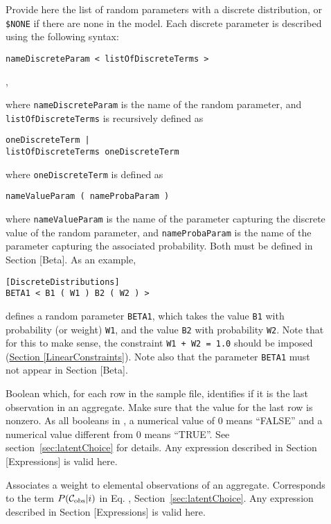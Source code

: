 \documentclass[12pt]{memoir}
\begin{document}
\begin{description}
\item[] Provide here the list of random parameters with a discrete distribution, or \verb+$NONE+ if there are none in the model. Each discrete parameter is described using the following syntax:
{\footnotesize
\begin{verbatim}
nameDiscreteParam < listOfDiscreteTerms >
\end{verbatim}, 
}
where \verb+nameDiscreteParam+ is the name of the random parameter, and 
  \verb+listOfDiscreteTerms+ is recursively defined as
{\footnotesize
\begin{verbatim}
oneDiscreteTerm |
listOfDiscreteTerms oneDiscreteTerm
\end{verbatim}
}
where \verb+oneDiscreteTerm+ is defined as 
{\footnotesize
\begin{verbatim}
nameValueParam ( nameProbaParam )
\end{verbatim}
}
where \verb+nameValueParam+ is the name of the parameter capturing the discrete value of the random parameter, and \verb+nameProbaParam+ is the name of the parameter capturing the associated probability. Both must be defined in Section [Beta]. As an example,
{\footnotesize
\begin{verbatim}
[DiscreteDistributions]
BETA1 < B1 ( W1 ) B2 ( W2 ) >
\end{verbatim}
}
defines a random parameter \verb+BETA1+, which takes the value \verb+B1+ with probability (or weight) \verb+W1+, and the value \verb+B2+ with probability \verb+W2+. Note that for this to make sense, the constraint \verb-W1 + W2 = 1.0- should be imposed (\hyperlink{LinearConstraints}{Section [LinearConstraints]}). Note also that the parameter \verb+BETA1+ must not appear in Section [Beta].

\item[] Boolean which, for each row in the sample file,   identifies if it is the last observation in an aggregate. Make sure that the value for the last row is nonzero. As all booleans in \BIOGEME, a numerical value of 0 means ``FALSE'' and a numerical value different from 0 means ``TRUE''. See section~\ref{sec:latentChoice} for details.
 Any expression  described in Section [Expressions] is valid here.

\item[]
Associates a weight to elemental observations of an aggregate. Corresponds to the term $P(\mathcal{C}_\text{obs}|i)$ in Eq. , Section~\ref{sec:latentChoice}. 
 Any expression  described in Section [Expressions] is valid here.
\end{description}
\end{document}
